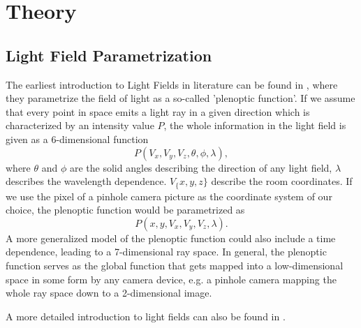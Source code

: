 \documentclass  [
  paper    = a4,
  BCOR     = 10mm,
  twoside,
  fontsize = 12pt,
  fleqn,
  toc      = bibnumbered,
  toc      = listofnumbered,
  numbers  = noendperiod,
  headings = normal,
  listof   = leveldown,
  version  = 3.03
]                                       {scrreprt}
\begin{document}
\chapter{Theory}
\section{Light Field Parametrization}
The earliest introduction to Light Fields in literature can be found in \cite{adelson1991plenoptic}, where they parametrize the field of light as a  so-called 'plenoptic function'. If we assume that every point in space emits a light ray  in a given direction which is characterized by an intensity value $P$, the whole information in the light field is given as a 6-dimensional function
\begin{equation}\label{key}
P(V_x,V_y, V_z, \theta, \phi, \lambda),
\end{equation}
where $\theta$ and $\phi$ are the solid angles describing the direction of any light field, $\lambda$ describes the wavelength dependence. $V_\{x,y,z\}$ describe the room coordinates. If we use the pixel of a pinhole camera picture as the coordinate system of our choice, the plenoptic function would be parametrized as 
\begin{equation}\label{eq:plenoptic}
P(x,y, V_x, V_y, V_z, \lambda).
\end{equation}
 A more generalized model of the plenoptic function could also include a time dependence, leading to a 7-dimensional ray space. In general, the plenoptic function serves as the global function that gets mapped into a low-dimensional space in some form by any camera device, e.g. a pinhole camera mapping the whole ray space down to a 2-dimensional image.\\
 	
 A more detailed introduction to light fields can also be found in \cite{wanner2014orientation}. 
\end{document}
